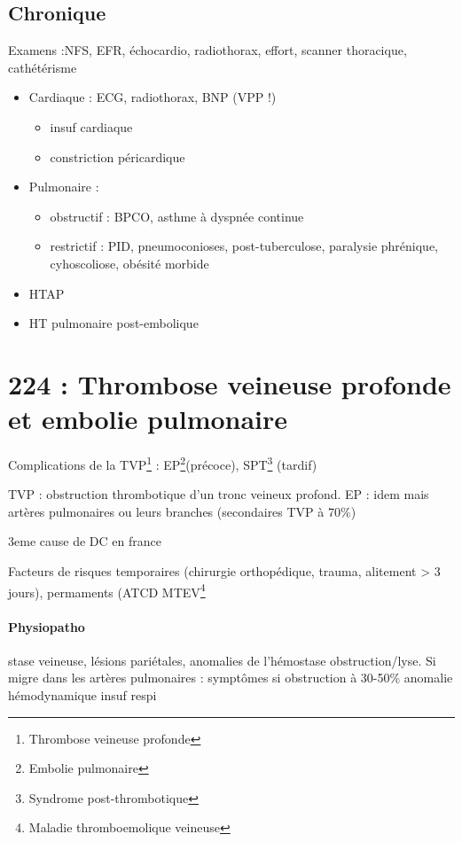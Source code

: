 \documentclass{article}
\begin{document}
\subsection{Chronique}
Examens :NFS, EFR, échocardio, radiothorax, effort, scanner thoracique,
cathétérisme

\begin{itemize}
  \item Cardiaque : ECG, radiothorax, BNP (VPP !)
    \begin{itemize}
      \item insuf cardiaque
      \item constriction péricardique
    \end{itemize}
  \item Pulmonaire :
    \begin{itemize}
      \item obstructif : BPCO, asthme à dyspnée continue
      \item restrictif : PID, pneumoconioses, post-tuberculose, paralysie phrénique,
        cyhoscoliose, obésité morbide
    \end{itemize}
  \item HTAP
  \item HT pulmonaire post-embolique
\end{itemize}





\section{224 : Thrombose veineuse profonde et embolie pulmonaire}%
\label{sec:224_thrombose_veineuse_profonde_et_embolie_pulmonaire}
Complications de la TVP\footnote{Thrombose veineuse profonde} :
EP\footnote{Embolie pulmonaire}(précoce), SPT\footnote{Syndrome post-thrombotique}
(tardif)

TVP : obstruction thrombotique d'un tronc veineux profond. EP : idem mais
artères pulmonaires ou leurs branches (secondaires TVP à 70\%)

3eme cause de DC en france

Facteurs de risques temporaires (chirurgie orthopédique, trauma, alitement > 3
jours), permaments (ATCD MTEV\footnote{Maladie thromboemolique veineuse}

\paragraph{Physiopatho} stase veineuse, lésions pariétales, anomalies de l'hémostase \thus
obstruction/lyse. Si migre dans les artères pulmonaires : symptômes si
obstruction à 30-50\% \thus anomalie hémodynamique \thus insuf respi
\end{document}

